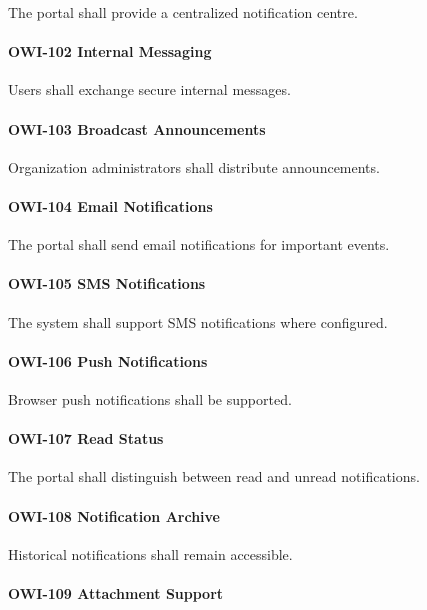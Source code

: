 The portal shall provide a centralized notification centre.

\paragraph{OWI-102 Internal Messaging}

Users shall exchange secure internal messages.

\paragraph{OWI-103 Broadcast Announcements}

Organization administrators shall distribute announcements.

\paragraph{OWI-104 Email Notifications}

The portal shall send email notifications for important events.

\paragraph{OWI-105 SMS Notifications}

The system shall support SMS notifications where configured.

\paragraph{OWI-106 Push Notifications}

Browser push notifications shall be supported.

\paragraph{OWI-107 Read Status}

The portal shall distinguish between read and unread notifications.

\paragraph{OWI-108 Notification Archive}

Historical notifications shall remain accessible.

\paragraph{OWI-109 Attachment Support}

